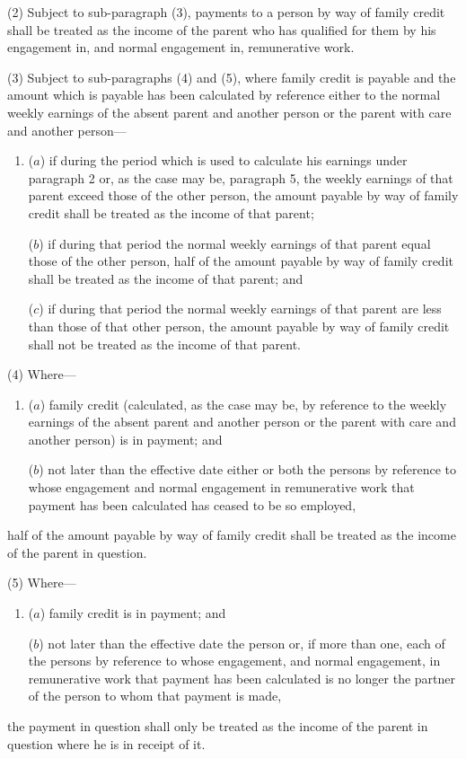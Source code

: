 \documentclass[a4paper]{article}
\begin{document}
(2) Subject to sub-paragraph (3), payments to a person by way of family credit shall be treated as the income of the parent who has qualified for them by his engagement in, and normal engagement in, remunerative work.

(3) Subject to sub-paragraphs (4) and (5), where family credit is payable and the amount which is payable has been calculated by reference either to the 
normal  %
weekly earnings of the absent parent and another person or the parent with care and another person—
\begin{enumerate}\item[]
($a$) if during the period which is used to calculate his earnings under paragraph 2 or, as the case may be, paragraph 5, the weekly earnings of that parent exceed those of the other person, the amount payable by way of family credit shall be treated as the income of that parent;

($b$) if during that period the normal weekly earnings of that parent equal those of the other person, half of the amount payable by way of family credit shall be treated as the income of that parent; and

($c$) if during that period the normal weekly earnings of that parent are less than those of that other person, the amount payable by way of family credit shall not be treated as the income of that parent.
\end{enumerate}

(4) Where—
\begin{enumerate}\item[]
($a$) family credit (calculated, as the case may be, by reference to the weekly earnings of the absent parent and another person or the parent with care and another person) is in payment; and

($b$) not later than the effective date either or both the persons by reference to whose engagement and normal engagement in remunerative work that payment has been calculated has ceased to be so employed,
\end{enumerate}
half of the amount payable by way of family credit shall be treated as the income of the parent in question.

(5) Where—
\begin{enumerate}\item[]
($a$) family credit is in payment; and

($b$) not later than the effective date the person or, if more than one, each of the persons by reference to whose engagement, and normal engagement, in remunerative work that payment has been calculated is no longer the partner of the person to whom that payment is made,
\end{enumerate}
the payment in question shall only be treated as the income of the parent in question where he is in receipt of it.
\end{document}
